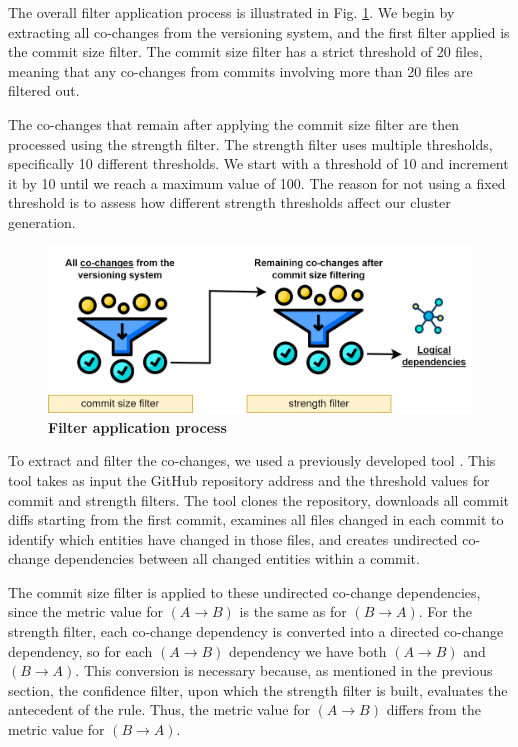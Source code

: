 \documentclass{ieeeaccess}
\begin{document}
The overall filter application process is illustrated in Fig. \ref{fig:filtering}.  We begin by extracting all co-changes from the versioning system, and the first filter applied is the commit size filter. The commit size filter has a strict threshold of 20 files, meaning that any co-changes from commits involving more than 20 files are filtered out.

The co-changes that remain after applying the commit size filter are then processed using the strength filter. The strength filter uses multiple thresholds, specifically 10 different thresholds. We start with a threshold of 10 and increment it by 10 until we reach a maximum value of 100. The reason for not using a fixed threshold is to assess how different strength thresholds affect our cluster generation. 

\begin{figure}[t!]
  \centering
  \includegraphics[width=\columnwidth]{filtering.png}
  \caption{ \textbf{Filter application process}}
  \label{fig:filtering}
\end{figure}

To extract and filter the co-changes, we used a previously developed tool \cite{b4}. This tool takes as input the GitHub repository address and the threshold values for commit and strength filters. The tool clones the repository, downloads all commit diffs starting from the first commit, examines all files changed in each commit to identify which entities have changed in those files, and creates undirected co-change dependencies between all changed entities within a commit.

The commit size filter is applied to these undirected co-change dependencies, since the metric value for $(A \rightarrow B)$ is the same as for $(B \rightarrow A)$. For the strength filter, each co-change dependency is converted into a directed co-change dependency, so for each $(A \rightarrow B)$ dependency we have both $(A \rightarrow B)$ and $(B \rightarrow A)$. This conversion is necessary because, as mentioned in the previous section, the confidence filter, upon which the strength filter is built, evaluates the antecedent of the rule. Thus, the metric value for $(A \rightarrow B)$ differs from the metric value for $(B \rightarrow A)$.
\end{document}
